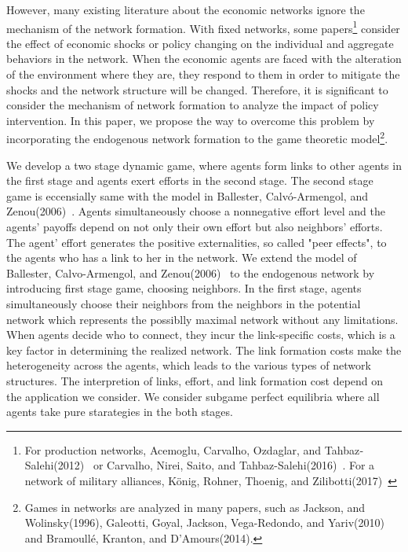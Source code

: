 \documentclass[12pt]{article}
\theoremstyle{definition}
\begin{document}
However, many existing literature about the economic networks ignore the mechanism of the network formation.
With fixed networks, some papers\footnote{For production networks, Acemoglu, Carvalho, Ozdaglar, and Tahbaz‐Salehi(2012)~\cite{origin} or Carvalho, Nirei, Saito, and Tahbaz-Salehi(2016)~\cite{nirei}. For a network of military alliances, K\"{o}nig, Rohner, Thoenig, and Zilibotti(2017)~\cite{conflict}} consider the effect of economic shocks or policy changing on the individual and aggregate behaviors in the network.
When the economic agents are faced with the alteration of the environment where they are, they respond to them in order to mitigate the shocks and the network structure will be changed.
Therefore, it is significant to consider the mechanism of network formation to analyze the impact of policy intervention.
In this paper, we propose the way to overcome this problem by incorporating the endogenous network formation to the game theoretic model\footnote{Games in networks are analyzed in many papers, such as Jackson, and Wolinsky(1996), Galeotti, Goyal, Jackson, Vega-Redondo, and Yariv(2010)~\cite{galeo} and Bramoull\'{e}, Kranton, and D'Amours(2014).}.

We develop a two stage dynamic game, where agents form links to other agents in the first stage and agents exert efforts in the second stage.
The second stage game is eccensially same with the model in Ballester, Calv\'{o}-Armengol, and Zenou(2006)~\cite{whowho}.
Agents simultaneously choose a nonnegative effort level and the agents' payoffs depend on not only their own effort but also neighbors' efforts.
The agent' effort generates the positive externalities, so called "peer effects", to the agents who has a link to her in the network.
We extend the model of Ballester, Calvo-Armengol, and Zenou(2006)~\cite{whowho} to the endogenous network by introducing first stage game, choosing neighbors.
In the first stage, agents simultaneously choose their neighbors from the neighbors in the potential network which represents the possiblly maximal network without any limitations.
When agents decide who to connect, they incur the link-specific costs, which is a key factor in determining the realized network.
The link formation costs make the heterogeneity across the agents, which leads to the various types of network structures.
The interpretion of links, effort, and link formation cost depend on the application we consider.
We consider subgame perfect equilibria where all agents take pure starategies in the both stages.
\end{document}
